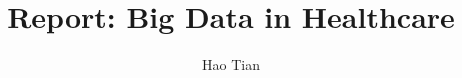 

\def\paperstatus{100} %
\def\paperchapter{Application} %
\def\hid{hid-sp18-hid524} %
\def\volume{9} %

\def\locator{\hid, Volume: \volume, Chapter: \paperchapter, Status: \paperstatus. \newline}

\title{Report: Big Data in Healthcare}

\author{Hao Tian}


\renewcommand{\shortauthors}{H. Tian.}


